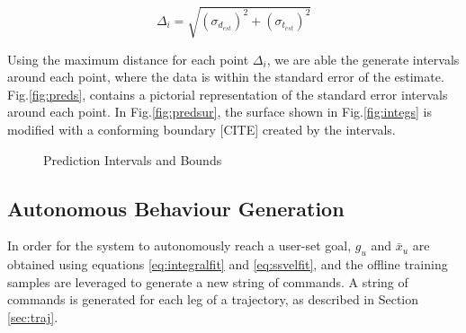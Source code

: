 \documentclass[letterpaper, 10 pt, conference]{ieeeconf}  %
\begin{document}
\begin{equation}
    \Delta_i = \sqrt{(\sigma_{d_{est}})^2+(\sigma_{t_{est}})^2}
\end{equation}

Using the maximum distance for each point $\Delta_i$, we are able the generate intervals around each point, where the data is within the standard error of the estimate. Fig.\ref{fig:preds}, contains a pictorial representation of the standard error intervals around each point. In Fig.\ref{fig:predsur}, the surface shown in Fig.\ref{fig:integs} is modified with a conforming boundary [CITE] created by the intervals.

\begin{figure}[ht]
	\centering
	\caption{Prediction Intervals and Bounds}
	\label{fig:bounds}
\end{figure}


\subsection{Autonomous Behaviour Generation}

In order for the system to autonomously reach a user-set goal, $g_u$ and $\bar{x}_u$ are obtained using equations \eqref{eq:integralfit} and \eqref{eq:ssvelfit}, and the offline training samples are leveraged to generate a new string of commands. A string of commands is generated for each leg of a trajectory, as described in Section \ref{sec:traj}.
\end{document}
